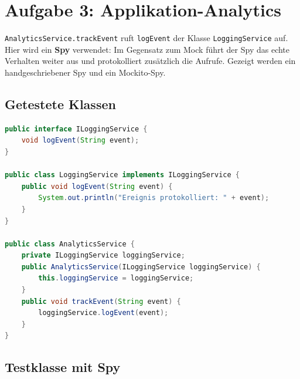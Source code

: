 \documentclass[
	fontsize=12pt,          %
	paper=a4,               %
	numbers=noenddot,       %
	listof=totoc,           %
	listof=entryprefix,     %
	listof=nochaptergap,    %
	bibliography=totoc,     %
	parskip=half,           %
	openany                 %
]{scrbook}
\begin{document}
\chapter*{Aufgabe 3: Applikation-Analytics}

\texttt{AnalyticsService.trackEvent} ruft \texttt{logEvent} der Klasse
\texttt{LoggingService} auf. Hier wird ein \textbf{Spy} verwendet: Im Gegensatz
zum Mock führt der Spy das echte Verhalten weiter aus und protokolliert
zusätzlich die Aufrufe. Gezeigt werden ein handgeschriebener Spy und ein
Mockito-Spy.

\section*{Getestete Klassen}

\begin{lstlisting}[language=Java]
public interface ILoggingService {
    void logEvent(String event);
}

public class LoggingService implements ILoggingService {
    public void logEvent(String event) {
        System.out.println("Ereignis protokolliert: " + event);
    }
}

public class AnalyticsService {
    private ILoggingService loggingService;
    public AnalyticsService(ILoggingService loggingService) {
        this.loggingService = loggingService;
    }
    public void trackEvent(String event) {
        loggingService.logEvent(event);
    }
}
\end{lstlisting}

\section*{Testklasse mit Spy}
\end{document}
